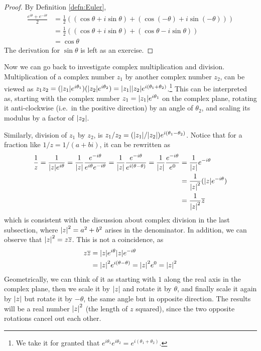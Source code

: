 \begin{proof}
By Definition \ref{defn:Euler},
\begin{align*}
\frac{e^{i\theta} + e^{-i\theta}}{2} &= \frac{1}{2}((\cos \theta + i \sin \theta) + (\cos (-\theta) + i \sin (-\theta))) \\
&= \frac{1}{2}((\cos \theta + i \sin \theta) + (\cos \theta - i \sin \theta)) \\
&= \cos \theta
\end{align*}  
The derivation for $\sin \theta$ is left as an exercise.
\end{proof}
Now we can go back to investigate complex multiplication and division. Multiplication of a complex number $z_1$ by another complex number $z_2$, can be viewed as $z_1z_2 = (\abs{z_1}e^{i \theta_1}) (\abs{z_2} e^{i \theta_2}) = \abs{z_1}\abs{z_2}e^{i (\theta_1+\theta_2)}$.\footnote{We take it for granted that $e^{i \theta_1}e^{i \theta_2} = e^{i (\theta_1+\theta_2)}$.} This can be interpreted as, starting with the complex number $z_1 = \abs{z_1}e^{i \theta_1}$ on the complex plane, rotating it anti-clockwise (i.e.\ in the positive direction) by an angle of $\theta_2$, and scaling its modulus by a factor of $\abs{z_2}$. \par
Similarly, division of $z_1$ by $z_2$, is $z_1/z_2 = (\abs{z_1}/\abs{z_2})e^{i (\theta_1-\theta_2)}$. Notice that for a fraction like $1/z = 1/(a+bi)$, it can be rewritten as
\begin{align*}
\frac{1}{z} = \frac{1}{\abs{z}e^{i \theta}} = \frac{1}{\abs{z}}\frac{e^{-i \theta}}{e^{i \theta}e^{-i \theta}} = \frac{1}{\abs{z}}\frac{e^{-i \theta}}{e^{i (\theta-\theta)}} = \frac{1}{\abs{z}}\frac{e^{-i \theta}}{e^0} &= \frac{1}{\abs{z}} e^{-i \theta} \\
&= \frac{1}{\abs{z}^2} (\abs{z} e^{-i \theta}) \\
&= \frac{1}{\abs{z}^2} \overline{z}
\end{align*}
which is consistent with the discussion about complex division in the last subsection, where $\abs{z}^2 = a^2 + b^2$ arises in the denominator. In addition, we can observe that $\abs{z}^2 = z\overline{z}$. This is not a coincidence, as
\begin{align}
z\overline{z} &= \abs{z} e^{i \theta} \abs{z} e^{-i \theta} \nonumber \\
&= \abs{z}^2 e^{i(\theta-\theta)} = \abs{z}^2e^{0} = \abs{z}^2 \label{eqn:zzbar}
\end{align}
Geometrically, we can think of it as starting with $1$ along the real axis in the complex plane, then we scale it by $\abs{z}$ and rotate it by $\theta$, and finally scale it again by $\abs{z}$ but rotate it by $-\theta$, the same angle but in opposite direction. The results will be a real number $\abs{z}^2$ (the length of $z$ squared), since the two opposite rotations cancel out each other. \par
